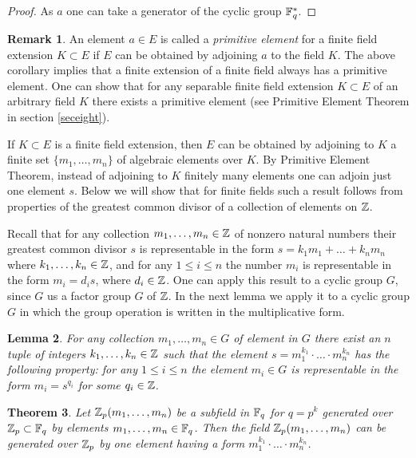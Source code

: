 \documentclass[11pt]{article}
\theoremstyle{plain}
\newtheorem{theorem}{Theorem}[section]
\newtheorem{lemma}[theorem]{Lemma}
\theoremstyle{definition}
\newtheorem{remark}[theorem]{Remark}
\begin{document}
\begin{proof} As $a$ one can take a generator of the cyclic group $\Bbb F^*_q$.
\end{proof}

\begin{remark}
An element $a\in E$ is called a {\it primitive element} for a finite field extension $K\subset E$ if $E$ can be obtained by adjoining $a$ to the field $K$. The above  corollary implies that a finite extension of a finite field always has  a primitive element. One can show that
for any separable finite field extension $K\subset E$ of an arbitrary field $K$ there exists  a primitive element  (see  Primitive Element Theorem in section \ref{seceight}).
  \end{remark}

If $K\subset E$ is a finite field extension, then $E$ can be obtained by adjoining to $K$ a finite set $\{m_1,\dots, m_n\}$ of algebraic elements over $K$. By Primitive Element Theorem, instead of adjoining  to $K$ finitely many elements one can adjoin just one element $s$. Below we will show that for finite fields such a result follows from  properties of the greatest common divisor of a collection of elements on $\Bbb Z$.

Recall that for any collection $m_1,\dots,m_n\in \Bbb Z$ of nonzero natural numbers their greatest  common divisor $s$ is representable in the form  $s=k_1m_1+\dots+k_nm_n$  where  $k_1,\dots,k_n\in \Bbb Z$, and for any $1\leq i\leq n$ the number $m_i$ is representable in the form  $m_i=d_i s$, where $d_i\in \Bbb Z$. One can apply this result to a cyclic group $G$, since $G$ us a  factor group  $G$ of $\Bbb  Z$. In the next lemma  we apply it  to a cyclic  group $G$ in which  the group operation is written in the multiplicative form.

\begin{lemma}\label{gcd}  For any collection $m_1,\dots,m_n\in G$ of element in $G$ there exist an $n$ tuple of integers $k_1,\dots,k_n\in \Bbb Z$ such that the element  $s=m_1^{k_1}\cdot \ldots \cdot m_n^{k_n}$ has the following property: for any $1\leq i\leq n$ the element  $m_i\in G$ is representable in the form  $m_i=s^{q_i}$ for some $q_i\in \Bbb Z$.
\end{lemma}

\begin{theorem} Let $\Bbb Z_p(m_1,\dots,m_n)$ be a subfield in $\Bbb F_q$ for $q=p^k$  generated over $\Bbb Z_p\subset \Bbb F_q$ by elements $m_1,\dots, m_n\in \Bbb F_q$. Then the field $\Bbb Z_p(m_1,\dots,m_n)$ can be  generated over $\Bbb Z_p$ by one element having a form $m_1^{k_1}\cdot \ldots \cdot m_n^{k_n}$.
\end{theorem}
\end{document}
